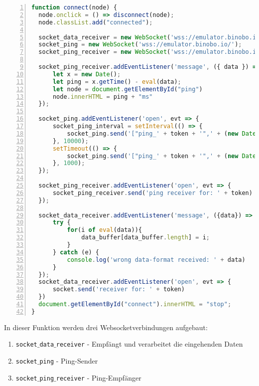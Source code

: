 \documentclass[paper=a4,12pt]{scrreprt}
\begin{document}
\begin{lstlisting}[caption={Webbrowser - Websocketclient}, captionpos=b, label={listing:browser_websock_client},language=javascript, numbers=left,
  stepnumber=1]
function connect(node) {
  node.onclick = () => disconnect(node);
  node.classList.add("connected");

  socket_data_receiver = new WebSocket('wss://emulator.binobo.io/' + token);
  socket_ping = new WebSocket('wss://emulator.binobo.io/');
  socket_ping_receiver = new WebSocket('wss://emulator.binobo.io/ping_' + token);

  socket_ping_receiver.addEventListener('message', ({ data }) => {
      let x = new Date();
      let ping = x.getTime() - eval(data);
      let node = document.getElementById("ping")
      node.innerHTML = ping + "ms"
  });

  socket_ping.addEventListener('open', evt => {
      socket_ping_interval = setInterval(() => {
          socket_ping.send('["ping_' + token + '",' + (new Date()).getTime() + "]");
      }, 10000);
      setTimeout(() => {
          socket_ping.send('["ping_' + token + '",' + (new Date()).getTime() + "]");
      }, 1000);
  });

  socket_ping_receiver.addEventListener('open', evt => {
      socket_ping_receiver.send('ping receiver for: ' + token)
  });

  socket_data_receiver.addEventListener('message', ({data}) => {
      try {
          for(i of eval(data)){
              data_buffer[data_buffer.length] = i;
          }
      } catch (e) {
          console.log('wrong data-format received: ' + data)
      }
  });
  socket_data_receiver.addEventListener('open', evt => {
      socket.send('receiver for: ' + token)
  })
  document.getElementById("connect").innerHTML = "stop";
}
\end{lstlisting}

In dieser Funktion werden drei Websocketverbindungen aufgebaut:\newline
\begin{enumerate}
  \item \texttt{socket$\_$data$\_$receiver} - Empfängt und verarbeitet die eingehenden Daten
  \item \texttt{socket$\_$ping} - Ping-Sender
  \item \texttt{socket$\_$ping$\_$receiver} - Ping-Empfänger
\end{enumerate}
\end{document}
